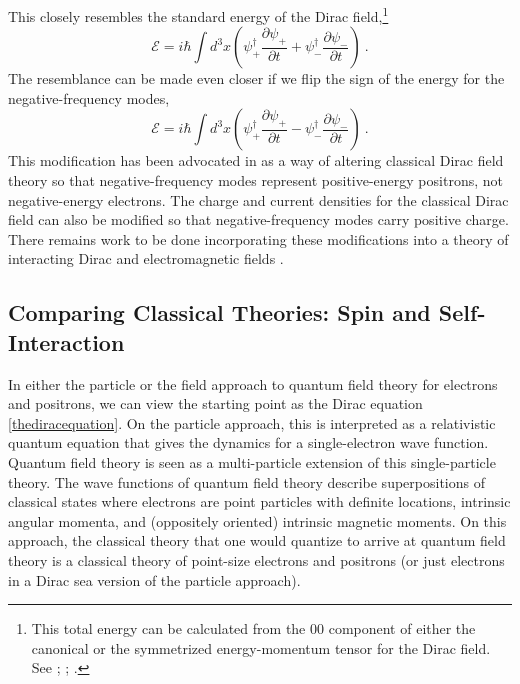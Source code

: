 \documentclass[12pt,onecolumn,secnumarabic,amsmath,amssymb,balancelastpage,nofootinbib]{article}
\begin{document}
This closely resembles the standard energy of the Dirac field,\footnote{This total energy can be calculated from the $00$ component of either the canonical or the symmetrized energy-momentum tensor for the Dirac field.  See \citet[pg.\ 419]{heitler}; \citet[pg.\ 219]{schweberQFT}; \citet[eq.\ 3]{positrons}.}
\begin{equation}
\mathcal{E}=i\hbar \int d^3x\left(\psi_+^{\dagger}\frac{\partial \psi_+}{\partial t}+\psi_-^{\dagger}\frac{\partial \psi_-}{\partial t}\right)
\ .
\end{equation}
The resemblance can be made even closer if we flip the sign of the energy for the negative-frequency modes,
\begin{equation}
\mathcal{E}=i\hbar \int d^3x\left(\psi_+^{\dagger}\frac{\partial \psi_+}{\partial t}-\psi_-^{\dagger}\frac{\partial \psi_-}{\partial t}\right)
\ .
\end{equation}
This modification has been advocated in \citet{positrons} as a way of altering classical Dirac field theory so that negative-frequency modes represent positive-energy positrons, not negative-energy electrons.  The charge and current densities for the classical Dirac field can also be modified so that negative-frequency modes carry positive charge.  There remains work to be done incorporating these modifications into a theory of interacting Dirac and electromagnetic fields \citep[sec.\ 5]{potentialenergy}.



\subsection{Comparing Classical Theories: Spin and Self-Interaction}\label{CLASSICALsection}

In either the particle or the field approach to quantum field theory for electrons and positrons, we can view the starting point as the Dirac equation \eqref{thediracequation}.  On the particle approach, this is interpreted as a relativistic quantum equation that gives the dynamics for a single-electron wave function.  Quantum field theory is seen as a multi-particle extension of this single-particle theory.  The wave functions of quantum field theory describe superpositions of classical states where electrons are point particles with definite locations, intrinsic angular momenta, and (oppositely oriented) intrinsic magnetic moments.  On this approach, the classical theory that one would quantize to arrive at quantum field theory is a classical theory of point-size electrons and positrons (or just electrons in a Dirac sea version of the particle approach).
\end{document}
